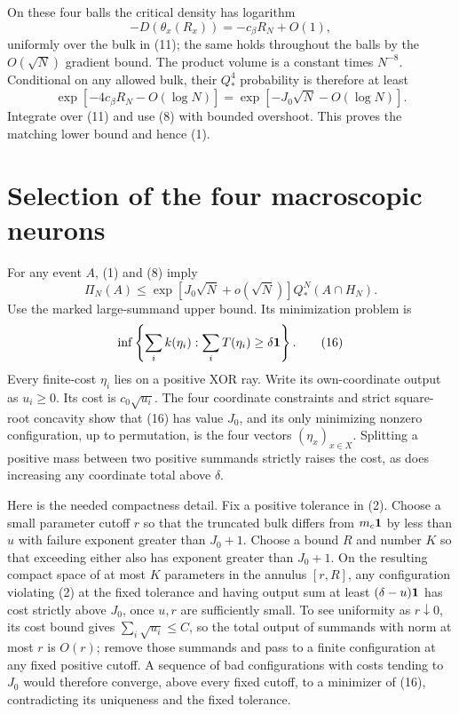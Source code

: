 \documentclass[11pt]{article}
\begin{document}
On these four balls the critical density has logarithm
\[
 -D(\theta_x(R_x))=-c_\beta R_N+O(1),                       \tag{13}
\]
uniformly over the bulk in (11); the same holds throughout the balls
by the $O(\sqrt N)$ gradient bound. The product volume is a constant
times $N^{-8}$. Conditional on any allowed bulk, their $Q_*^4$
probability is therefore at least
\[
 \exp[-4c_\beta R_N-O(\log N)]
       =\exp[-J_0\sqrt N-O(\log N)].                       \tag{14}
\]
Integrate over (11) and use (8) with bounded overshoot. This proves
the matching lower bound and hence (1).

\section{Selection of the four macroscopic neurons}
For any event $A$, (1) and (8) imply
\[
 \Pi_N(A)\le
 \exp[J_0\sqrt N+o(\sqrt N)]Q_*^N(A\cap H_N).              \tag{15}
\]
Use the marked large-summand upper bound. Its minimization problem is
\[
 \inf\left\{\sum_i k(\eta_i):
                \sum_iT(\eta_i)\ge\delta\mathbf 1\right\}.     \tag{16}
\]
Every finite-cost $\eta_i$ lies on a positive XOR ray. Write its
own-coordinate output as $u_i\ge0$. Its cost is $c_0\sqrt{u_i}$.
The four coordinate constraints and strict square-root concavity show
that (16) has value $J_0$, and its only minimizing nonzero configuration,
up to permutation, is the four vectors $(\eta_x)_{x\in X}$.
Splitting a positive mass between two positive summands strictly raises
the cost, as does increasing any coordinate total above $\delta$.

Here is the needed compactness detail. Fix a positive tolerance in (2).
Choose a small parameter cutoff $r$ so that the truncated bulk differs
from $m_c\mathbf 1$ by less than $u$ with failure exponent greater than
$J_0+1$. Choose a bound $R$ and number $K$ so that exceeding either
also has exponent greater than $J_0+1$. On the resulting compact
space of at most $K$ parameters in the annulus $[r,R]$, any configuration
violating (2) at the fixed tolerance and having output sum at least
$(\delta-u)\mathbf 1$ has cost strictly above $J_0$, once $u,r$ are
sufficiently small. To see uniformity as $r\downarrow0$, its cost
bound gives $\sum_i\sqrt{u_i}\le C$, so the total output of summands
with norm at most $r$ is $O(r)$; remove those summands and pass to
a finite configuration at any fixed positive cutoff. A sequence of
bad configurations with costs tending to $J_0$ would therefore
converge, above every fixed cutoff, to a minimizer of (16), contradicting
its uniqueness and the fixed tolerance.
\end{document}
